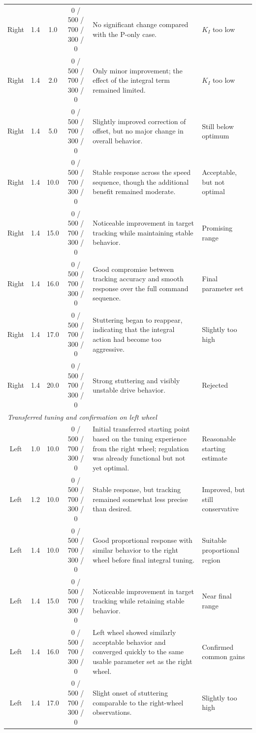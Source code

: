 \begin{table}[ht]
\begin{tabularx}{\textwidth}{c c c c X X}
Right & 1.4 & 1.0 & 0 / 500 / 700 / 300 / 0 & No significant change compared with the P-only case. & $K_I$ too low \\
Right & 1.4 & 2.0 & 0 / 500 / 700 / 300 / 0 & Only minor improvement; the effect of the integral term remained limited. & $K_I$ too low \\
Right & 1.4 & 5.0 & 0 / 500 / 700 / 300 / 0 & Slightly improved correction of offset, but no major change in overall behavior. & Still below optimum \\
Right & 1.4 & 10.0 & 0 / 500 / 700 / 300 / 0 & Stable response across the speed sequence, though the additional benefit remained moderate. & Acceptable, but not optimal \\
Right & 1.4 & 15.0 & 0 / 500 / 700 / 300 / 0 & Noticeable improvement in target tracking while maintaining stable behavior. & Promising range \\
Right & 1.4 & 16.0 & 0 / 500 / 700 / 300 / 0 & Good compromise between tracking accuracy and smooth response over the full command sequence. & Final parameter set \\
Right & 1.4 & 17.0 & 0 / 500 / 700 / 300 / 0 & Stuttering began to reappear, indicating that the integral action had become too aggressive. & Slightly too high \\
Right & 1.4 & 20.0 & 0 / 500 / 700 / 300 / 0 & Strong stuttering and visibly unstable drive behavior. & Rejected \\
\hline
\multicolumn{6}{l}{\textit{Transferred tuning and confirmation on left wheel}} \\
\hline
Left & 1.0 & 10.0 & 0 / 500 / 700 / 300 / 0 & Initial transferred starting point based on the tuning experience from the right wheel; regulation was already functional but not yet optimal. & Reasonable starting estimate \\
Left & 1.2 & 10.0 & 0 / 500 / 700 / 300 / 0 & Stable response, but tracking remained somewhat less precise than desired. & Improved, but still conservative \\
Left & 1.4 & 10.0 & 0 / 500 / 700 / 300 / 0 & Good proportional response with similar behavior to the right wheel before final integral tuning. & Suitable proportional region \\
Left & 1.4 & 15.0 & 0 / 500 / 700 / 300 / 0 & Noticeable improvement in target tracking while retaining stable behavior. & Near final range \\
Left & 1.4 & 16.0 & 0 / 500 / 700 / 300 / 0 & Left wheel showed similarly acceptable behavior and converged quickly to the same usable parameter set as the right wheel. & Confirmed common gains \\
Left & 1.4 & 17.0 & 0 / 500 / 700 / 300 / 0 & Slight onset of stuttering comparable to the right-wheel observations. & Slightly too high \\
\hline
\end{tabularx}
\end{table}

